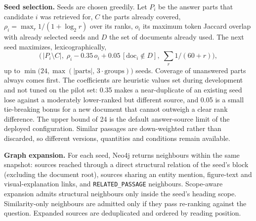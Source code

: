 \documentclass[runningheads]{llncs}
\begin{document}
\textbf{Seed selection.} Seeds are chosen greedily. Let $P_i$ be the answer parts that candidate $i$ was retrieved for, $C$ the parts already covered, $\rho_i=\max_r 1/(1+\log_2 r)$ over its ranks, $o_i$ its maximum token Jaccard overlap with already selected seeds and $D$ the set of documents already used. The next seed maximizes, lexicographically,
\begin{equation}
\bigl(\,|P_i\setminus C|,\;\rho_i-0.35\,o_i+0.05\,[\mathrm{doc}_i\notin D],\;\textstyle\sum_r 1/(60+r)\bigr),
\end{equation}
up to $\min\!\bigl(24,\max(|\text{parts}|,\,3\cdot\text{groups})\bigr)$ seeds. Coverage of unanswered parts always comes first. The coefficients are heuristic values set during development and not tuned on the pilot set: 0.35 makes a near-duplicate of an existing seed lose against a moderately lower-ranked but different source, and 0.05 is a small tie-breaking bonus for a new document that cannot outweigh a clear rank difference. The upper bound of 24 is the default answer-source limit of the deployed configuration. Similar passages are down-weighted rather than discarded, so different versions, quantities and conditions remain available.

\textbf{Graph expansion.} For each seed, Neo4j returns neighbours within the same snapshot: sources reached through a direct structural relation of the seed's block (excluding the document root), sources sharing an entity mention, figure-text and visual-explanation links, and \texttt{RELATED\_PASSAGE} neighbours. Scope-aware expansion admits structural neighbours only inside the seed's heading scope. Similarity-only neighbours are admitted only if they pass re-ranking against the question. Expanded sources are deduplicated and ordered by reading position.
\end{document}

